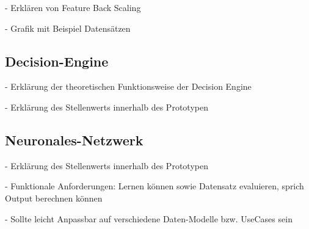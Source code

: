 - Erklären von Feature Back Scaling

- Grafik mit Beispiel Datensätzen

\subsection{Decision-Engine}
\label{subsec:Engine3}

- Erklärung der theoretischen Funktionsweise der Decision Engine

- Erklärung des Stellenwerts innerhalb des Prototypen

\subsection{Neuronales-Netzwerk}
- Erklärung des Stellenwerts innerhalb des Prototypen 

- Funktionale Anforderungen: Lernen können sowie Datensatz evaluieren, sprich Output berechnen können

- Sollte leicht Anpassbar auf verschiedene Daten-Modelle bzw. UseCases sein 

